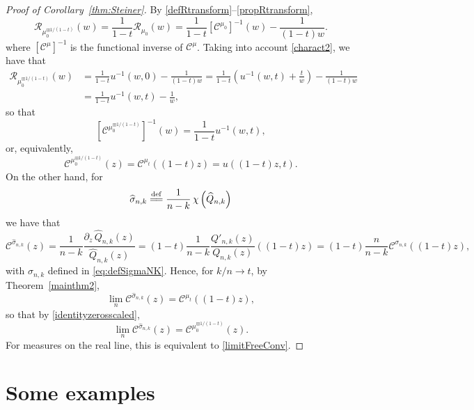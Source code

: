 \documentclass[reqno,11pt]{amsart}
\theoremstyle{plain}
\theoremstyle{definition}
\theoremstyle{remark}
\numberwithin{equation}{section}
\numberwithin{equation}{section}
\newcommand{\isdef}{\overset{\mathrm{def}}{=\joinrel=}}
\begin{document}
\begin{proof}[Proof of Corollary~\ref{thm:Steiner}]
    By \eqref{defRtransform}--\eqref{propRtransform},
    $$ 
	 \mathcal R_{\mu_0^{\boxplus 1/(1-t)}} (w) = \frac{1}{1-t}\mathcal R_{\mu_0 } (w)  = \frac{1}{1-t} \left[ \mathcal C^{\mu_0}\right]^{-1}(w)-\frac{1}{(1-t) w}.
 $$
  where $\left[ \mathcal C^\mu\right]^{-1}$ is the functional inverse of $ \mathcal C^\mu$.	Taking into account \eqref{charact2}, we have that
  \begin{align*}
       \mathcal R_{\mu_0^{\boxplus 1/(1-t)}} (w) &=  \frac{1}{1-t} u^{-1} (w, 0) -\frac{1}{(1-t) w} =  \frac{1}{1-t} \left( u^{-1} (w, t) +\frac{t}{w}\right) -\frac{1}{(1-t) w} \\ &= \frac{1}{1-t}   u^{-1} (w, t)-\frac{1}{  w} ,
  \end{align*}
so that
$$
\left[ \mathcal C^{\mu_0^{\boxplus 1/(1-t)}}\right]^{-1}(w) = \frac{1}{1-t}   u^{-1} (w, t) ,
$$
or, equivalently,
\begin{equation}
    \label{identityzerosscaled}
\mathcal C^{\mu_0^{\boxplus 1/(1-t)}}\left(z \right)= \mathcal C^{\mu_t}((1-t) z)=u((1-t)z,t) .
\end{equation}
On the other hand, for  
$$   
\widehat \sigma_{n,k} \isdef \frac{1}{n-k} \, \chi\left(\widehat  Q_{n,k} \right)  
$$
we have that
$$
\mathcal C^{\widehat \sigma_{n,k} }\left(z \right)=  \frac{1}{n-k} \frac{ \partial_z\,  \widehat Q_{n,k}(z)}{\widehat Q_{n,k}(z)} = (1-t) \frac{1}{n-k} \frac{  Q'_{n,k}(z)}{ Q_{n,k}(z)} \left((1-t)z \right) = (1-t) \frac{n}{n-k} \mathcal C^{  \sigma_{n,k} }\left((1-t)z \right),
$$
with $ \sigma_{n,k}$ defined in \eqref{eq:defSigmaNK}. Hence, for $k/n\to t$, by Theorem~\ref{mainthm2},  
$$
\lim_{n }\mathcal C^{\widehat \sigma_{n,k} }\left(z \right)= \mathcal C^{  \mu_t }\left((1-t)z \right),
$$
so that by \eqref{identityzerosscaled},
   $$
\lim_{n }\mathcal C^{\widehat \sigma_{n,k} }\left(z \right)= \mathcal C^{\mu_0^{\boxplus 1/(1-t)}}\left(z \right).
$$
For measures on the real line, this is equivalent to \eqref{limitFreeConv}.
\end{proof}


\section{Some examples} \label{sec:examples}
\end{document}
